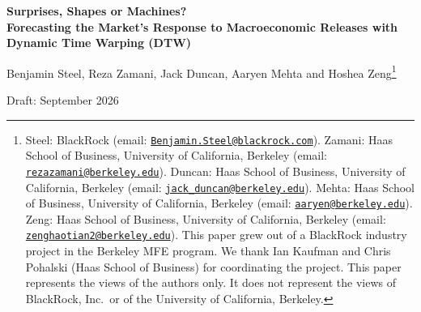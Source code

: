 \documentclass[11pt]{article}
\begin{document}
\begingroup
\begin{center}
{\Large\bfseries Surprises, Shapes or Machines?\\[4pt]
\large Forecasting the Market's Response to Macroeconomic Releases with Dynamic Time Warping (DTW)\par}
\vspace{1.5em}
{\large Benjamin Steel, Reza Zamani, Jack Duncan, Aaryen Mehta and Hoshea Zeng\footnote{%
Steel: BlackRock (email: \href{mailto:Benjamin.Steel@blackrock.com}{\nolinkurl{Benjamin.Steel@blackrock.com}}).
Zamani: Haas School of Business, University of California, Berkeley (email:
\href{mailto:rezazamani@berkeley.edu}{\nolinkurl{rezazamani@berkeley.edu}}).
Duncan: Haas School of Business, University of California, Berkeley (email:
\href{mailto:jack_duncan@berkeley.edu}{\nolinkurl{jack_duncan@berkeley.edu}}).
Mehta: Haas School of Business, University of California, Berkeley (email:
\href{mailto:aaryen@berkeley.edu}{\nolinkurl{aaryen@berkeley.edu}}).
Zeng: Haas School of Business, University of California, Berkeley (email:
\href{mailto:zenghaotian2@berkeley.edu}{\nolinkurl{zenghaotian2@berkeley.edu}}).
This paper grew out of a
BlackRock industry project in the Berkeley MFE program. We thank Ian Kaufman and Chris Pohalski
(Haas School of Business) for coordinating the project. This paper represents the views of the
authors only. It does not represent the views of BlackRock, Inc.\ or of the University of
California, Berkeley.}\par}
\vspace{0.5em}
{\normalsize Draft: September 2026\par}
\end{center}
\vspace{1.5em}



\endgroup
\vspace{0.5em}






\FloatBarrier


\enlargethispage{2\baselineskip}
\begingroup\footnotesize\setlength{\bibsep}{0pt}

\endgroup
\end{document}
